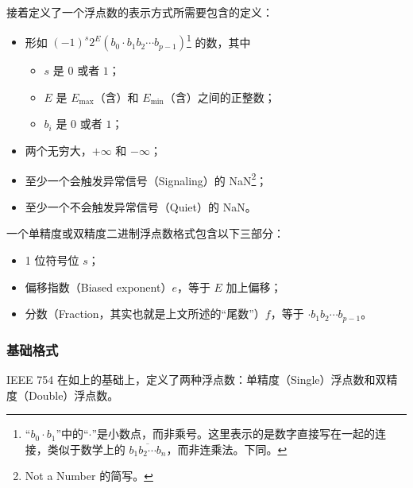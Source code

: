             接着定义了一个浮点数的表示方式所需要包含的定义：
            \begin{itemize}
                \item 形如 $(-1)^s2^E(b_0 \cdot b_1b_2 \cdots b_{p-1})$\footnote{“$b_0 \cdot b_1$”中的“$\cdot$”是小数点，而非乘号。这里表示的是数字直接写在一起的连接，类似于数学上的 $\overline{b_1b_2 \cdots b_n}$，而非连乘法。下同。} 的数，其中
                    \begin{itemize}
                        \item $s$ 是 $0$ 或者 $1$；
                        \item $E$ 是 $E_{\max}$（含）和 $E_{\min}$（含）之间的正整数；
                        \item $b_i$ 是 $0$ 或者 $1$；
                    \end{itemize}
                \item 两个无穷大，$+\infty$ 和 $-\infty$；
                \item 至少一个会触发异常信号（Signaling）的 NaN\footnote{Not a Number 的简写。}；
                \item 至少一个不会触发异常信号（Quiet）的 NaN。
            \end{itemize}

            一个单精度或双精度二进制浮点数格式包含以下三部分：
            \begin{itemize}
                \item 1 位符号位 $s$；
                \item 偏移指数（Biased exponent）$e$，等于 $E$ 加上偏移；
                \item 分数（Fraction，其实也就是上文所述的“尾数”）$f$，等于 $\cdot b_1b_2 \cdots b_{p-1}$。
            \end{itemize}

        \subsubsection{基础格式}\label{subsubsec:NumberSystemBasics/fixed-point-and-floating-point/ieee-754/basic-format}
            IEEE 754 在如上的基础上，定义了两种浮点数：单精度（Single）浮点数和双精度（Double）浮点数。

